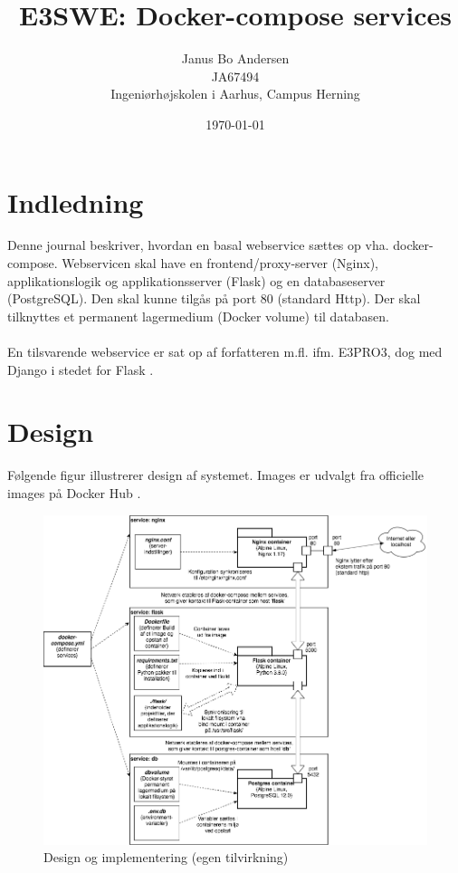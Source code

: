 \documentclass[a4paper]{article}
\title{E3SWE: Docker-compose services}
\author{Janus Bo Andersen  \\
	JA67494 \\
	Ingeniørhøjskolen i Aarhus, Campus Herning
	}
\date{\today}
\begin{document}
\maketitle

\section{Indledning}
Denne journal beskriver, hvordan en basal webservice sættes op vha. docker-compose.
Webservicen skal have en frontend/proxy-server (Nginx),
applikationslogik og applikationsserver (Flask) og en
databaseserver (PostgreSQL).
Den skal kunne tilgås på port 80 (standard Http).
Der skal tilknyttes et permanent lagermedium (Docker volume) til databasen.
\\\\
En tilsvarende webservice er sat op af forfatteren m.fl. ifm. E3PRO3, dog med Django i stedet for Flask \cite{team2}.

\section{Design}
Følgende figur illustrerer design af systemet.
Images er udvalgt fra officielle images på Docker Hub \cite{hub}.

\begin{figure}[H]
\centering
\includegraphics[width=14cm]{../img/flask-django.png}
\caption{Design og implementering (egen tilvirkning)\label{fig:design}}
\end{figure}
\end{document}
